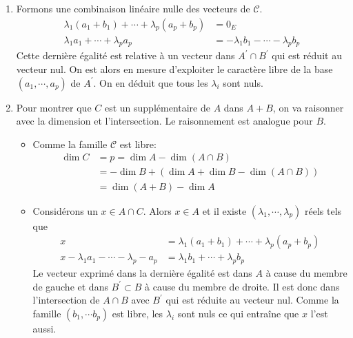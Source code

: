 \begin{enumerate}
\begin{enumerate}
\begin{itemize}
\item \`A cause des définitions : $\dim A^\prime =\dim B^\prime = \dim A  - \dim A\cap B = \dim B  - \dim A\cap B$.
\end{itemize}

\item Formons une combinaison linéaire nulle des vecteurs de $\mathcal C$.
\begin{align*}
 \lambda_1(a_1+b_1)+\cdots + \lambda_p(a_p+b_p) &= 0_E \\
\lambda_1a_1 + \cdots + \lambda_p a_p &= -\lambda_1 b_1 - \cdots - \lambda_p b_p 
\end{align*}
Cette dernière égalité est relative à un vecteur dans $A^\prime \cap B^\prime$ qui est réduit au vecteur nul. On est alors en mesure d'exploiter le caractère libre de la base $(a_1,\cdots, a_p)$ de $A^\prime$. On en déduit que tous les $\lambda_i$ sont nuls.

\item Pour montrer que $C$ est un supplémentaire de $A$ dans $A+B$, on va raisonner avec la dimension et l'intersection. Le raisonnement est analogue pour $B$.
\begin{itemize}
 \item Comme la famille $\mathcal C$ est libre:
\begin{displaymath}
\begin{split}
\dim C &= p = \dim A - \dim (A\cap B) \\
&=-\dim B + (\dim A +\dim B -\dim (A\cap B))\\
&=\dim(A+B) -\dim A 
\end{split}
\end{displaymath}
\item Considérons un $x\in A\cap C$. Alors $x\in A$ et il existe $(\lambda_1,\cdots,\lambda_p)$ réels tels que
\begin{align*}
 x&= \lambda_1(a_1+b_1)+\cdots + \lambda_p(a_p+b_p) \\
x-\lambda_1a_1 -\cdots - \lambda_p-a_p &= \lambda_1 b_1 + \cdots + \lambda_p b_p
\end{align*}
Le vecteur exprimé dans la dernière égalité est dans $A$ à cause du membre de gauche et dans $B^\prime \subset B$ à cause du membre de droite. Il est donc dans l'intersection de $A\cap B$ avec $B^\prime$ qui est réduite au vecteur nul. Comme la famille $(b_1,\cdots b_p)$ est libre, les $\lambda_i$ sont nuls ce qui entraîne que $x$ l'est aussi.
\end{itemize}

\end{enumerate}

\end{enumerate}
